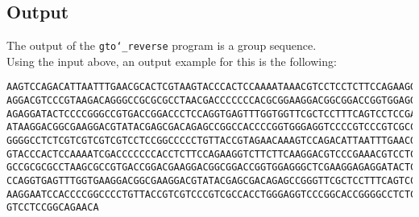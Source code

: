 \subsection*{Output}
The output of the \texttt{gto\char`_reverse} program is a group sequence.\\
Using the input above, an output example for this is the following:
\begin{lstlisting}
AAGTCCAGACATTAATTTGAACGCACTCGTAAGTACCCACTCCAAAATAAACGTCCTCCTCTTCCAGAAGGTCTTCTTCA
AGGACGTCCCGTAAGACAGGGCCGCGCGCCTAACGACCCCCCCACGCGGAAGGACGGCGGACCGGTGGAGGGCTCGAAGG
AGAGGATACTCCCCGGGCCGTGACCGGACCCTCCAGGTGAGTTTGGTGGTTCGCTCCTTTCAGTCCTCCGACGAAAAGGA
ATAAGGACGGCGAAGGACGTATACGAGCGACAGAGCCGGCCACCCCGGTGGGAGGTCCCCGTCCCGTCGCCACCGGCACC
GGGGCCTCTCGTCGTCGTCGTCCTCCGGCCCCCTGTTACCGTAGAACAAAGTCCAGACATTAATTTGAACGCACTCGTAA
GTACCCACTCCAAAATCGACCCCCCCACCTCTTCCAGAAGGTCTTCTTCAAGGACGTCCCGAAACGTCCTCTAAGACAGG
GCCGCGCGCCTAAGCGCCGTGACCGGACGAAGGACGGCGGACCGGTGGAGGGCTCGAAGGAGAGGATACTCCCCGGGCCT
CCAGGTGAGTTTGGTGAAGGACGGCGAAGGACGTATACGAGCGACAGAGCCGGGTTCGCTCCTTTCAGTCCTCCGACGAA
AAGGAATCCACCCCGGCCCCTGTTACCGTCGTCCCGTCGCCACCTGGGAGGTCCCGGCACCGGGGCCTCTCGTCGTCGTC
GTCCTCCGGCAGAACA
\end{lstlisting}